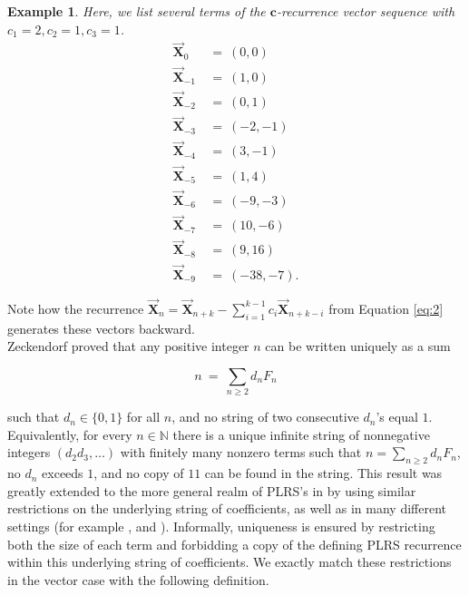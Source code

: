 \documentclass[]{interact}
\newcommand{\vtr}[1]{\vec{\mathbf{#1}}}
\theoremstyle{plain}
\numberwithin{equation}{section} %
\newtheorem{example}[thm]{Example}
\numberwithin{table}{section} %
\numberwithin{figure}{section}
\begin{document}
\begin{example}\label{Ex: (2,1,1) Rec Vectors}
    Here, we list several terms of the $\mathbf{c}$-recurrence vector sequence with $c_1 = 2, c_2 = 1, c_3 = 1$.
\begin{align*}
    \vtr{\mathbf{X}}_0  \ &\ =\  (0,0) \\
    \vtr{\mathbf{X}}_{-1} &\ =\ (1,0) \\
    \vtr{\mathbf{X}}_{-2} &\ =\ (0,1) \\
    \vtr{\mathbf{X}}_{-3} &\ =\  (-2,-1) \\
    \vtr{\mathbf{X}}_{-4} &\ =\ (3,-1) \\
    \vtr{\mathbf{X}}_{-5} &\ =\ (1,4) \\
    \vtr{\mathbf{X}}_{-6} &\ =\ (-9,-3) \\
    \vtr{\mathbf{X}}_{-7} &\ =\ (10,-6) \\
    \vtr{\mathbf{X}}_{-8} &\ =\ (9,16) \\
    \vtr{\mathbf{X}}_{-9} &\ =\ (-38,-7). 
\end{align*}
\end{example}

Note how the recurrence $\vtr{\mathbf{X}}_n = \vtr{\mathbf{X}}_{n+k} - \sum_{i=1}^{k-1}c_i\vtr{\mathbf{X}}_{n+k-i}$ from Equation \textcolor{blue}{\eqref{eq:2}} generates these vectors backward.\\

Zeckendorf \textcolor{blue}{\cite{Zeckendorf72}} proved that any positive integer $n$ can be written uniquely as a sum

$$n\ =\ \sum_{n\geq 2}d_nF_n$$

\noindent such that $d_n\in \{0,1\}$ for all $n$, and no string of two consecutive $d_n$'s equal $1$. Equivalently, for every $n\in \mathbb{N}$ there is a unique infinite string of nonnegative integers $(d_2d_3,\ldots)$ with finitely many nonzero terms such that $n=\sum_{n\geq 2}d_nF_n$, no $d_n$ exceeds $1$, and no copy of $11$ can be found in the string. This result was greatly extended to the more general realm of PLRS's in \textcolor{blue}{\cite{MW12}} by using similar restrictions on the underlying string of coefficients, as well as in many different settings  (for example \textcolor{blue}{\cite{ABJ11}}, \textcolor{blue}{\cite{CHHMPV18}} and \textcolor{blue}{\cite{KKMW11}}). Informally, uniqueness is ensured by restricting both the size of each term and forbidding a copy of the defining PLRS recurrence within this underlying string of coefficients. We exactly match these restrictions in the vector case with the following definition. 
\end{document}
